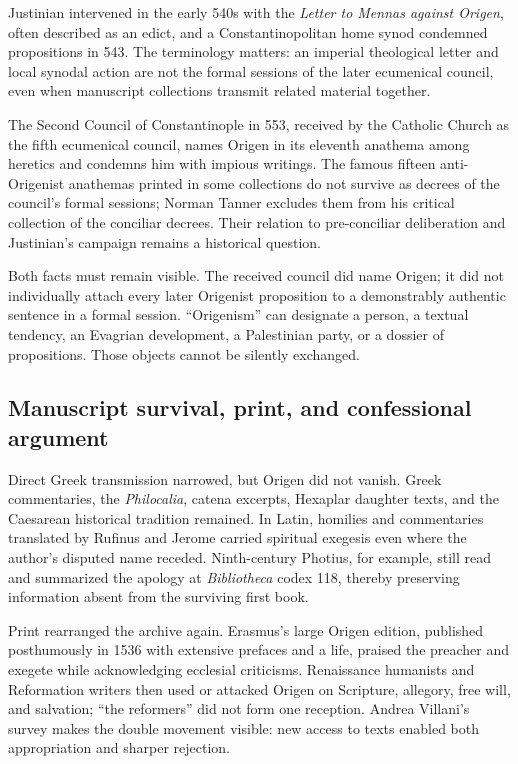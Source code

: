Justinian intervened in the early 540s with the \emph{Letter to Mennas against
Origen}, often described as an edict, and a Constantinopolitan home synod
condemned propositions in 543. The terminology matters: an imperial theological
letter and local synodal action are not the formal sessions of the later
ecumenical council, even when manuscript collections transmit related material
together.

The Second Council of Constantinople in 553, received by the Catholic Church as
the fifth ecumenical council, names Origen in its eleventh anathema among
heretics and condemns him with impious writings. The famous fifteen
anti-Origenist anathemas printed in some collections do not survive as decrees
of the council's formal sessions; Norman Tanner excludes them from his critical
collection of the conciliar decrees. Their relation to pre-conciliar
deliberation and Justinian's campaign remains a historical question.

Both facts must remain visible. The received council did name Origen; it did
not individually attach every later Origenist proposition to a demonstrably
authentic sentence in a formal session. ``Origenism'' can designate a person,
a textual tendency, an Evagrian development, a Palestinian party, or a dossier
of propositions. Those objects cannot be silently exchanged.

\subsection{Manuscript survival, print, and confessional argument}

Direct Greek transmission narrowed, but Origen did not vanish. Greek
commentaries, the \emph{Philocalia}, catena excerpts, Hexaplar daughter texts,
and the Caesarean historical tradition remained. In Latin, homilies and
commentaries translated by Rufinus and Jerome carried spiritual exegesis even
where the author's disputed name receded. Ninth-century Photius, for example,
still read and summarized the apology at \emph{Bibliotheca} codex 118, thereby
preserving information absent from the surviving first book.

Print rearranged the archive again. Erasmus's large Origen edition, published
posthumously in 1536 with extensive prefaces and a life, praised the preacher
and exegete while acknowledging ecclesial criticisms. Renaissance humanists
and Reformation writers then used or attacked Origen on Scripture, allegory,
free will, and salvation; ``the reformers'' did not form one reception. Andrea
Villani's survey makes the double movement visible: new access to texts enabled
both appropriation and sharper rejection.

